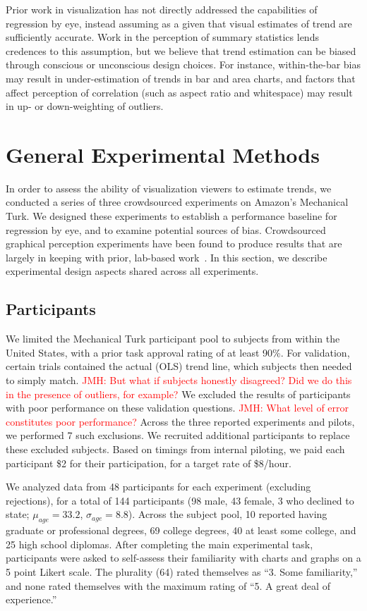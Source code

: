 \documentclass{sigchi}
\newcommand{\jeff}[1]{\textcolor{red}{JMH: #1}}
\begin{document}
Prior work in visualization has not directly addressed the capabilities of regression by eye, instead assuming as a given that visual estimates of trend are sufficiently accurate. Work in the perception of summary statistics lends credences to this assumption, but we believe that trend estimation can be biased through conscious or unconscious design choices. For instance, within-the-bar bias may result in under-estimation of trends in bar and area charts, and factors that affect perception of correlation (such as aspect ratio and whitespace) may result in up- or down-weighting of outliers.

\section{General Experimental Methods}

\expFig

In order to assess the ability of visualization viewers to estimate trends, we conducted a series of three crowdsourced experiments on Amazon's Mechanical Turk. We designed these experiments to establish a performance baseline for regression by eye, and to examine potential sources of bias. Crowdsourced graphical perception experiments have been found to produce results that are largely in keeping with prior, lab-based work~\cite{heer2010crowdsourcing, talbot2014four}. In this section, we describe experimental design aspects shared across all experiments.

\subsection{Participants}

We limited the Mechanical Turk participant pool to subjects from within the United States, with a prior task approval rating of at least 90\%. For validation, certain trials contained the actual (OLS) trend line, which subjects then needed to simply match. \jeff{But what if subjects honestly disagreed? Did we do this in the presence of outliers, for example?} We excluded the results of participants with poor performance on these validation questions. \jeff{What level of error constitutes poor performance?} Across the three reported experiments and pilots, we performed 7 such exclusions. We recruited additional participants to replace these excluded subjects. Based on timings from internal piloting, we paid each participant \$2 for their participation, for a target rate of \$8/hour.

We analyzed data from 48 participants for each experiment (excluding rejections), for a total of 144 participants (98 male, 43 female, 3 who declined to state; $\mu_{age}= 33.2$, $\sigma_{age}=8.8$). Across the subject pool, 10 reported having graduate or professional degrees, 69 college degrees, 40 at least some college, and 25 high school diplomas. After completing the main experimental task, participants were asked to self-assess their familiarity with charts and graphs on a 5 point Likert scale. The plurality (64) rated themselves as ``3. Some familiarity,'' and none rated themselves with the maximum rating of ``5. A great deal of experience.''
\end{document}
